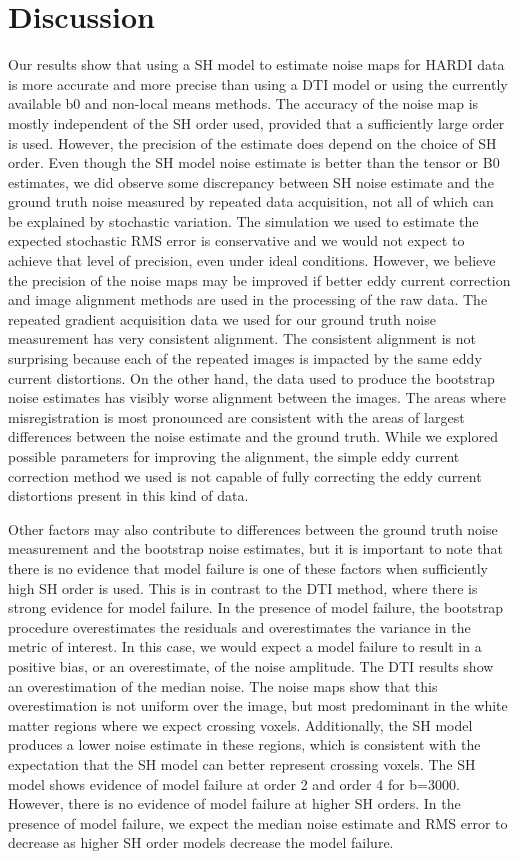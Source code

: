 \section{Discussion}

Our results show that using a SH model to estimate noise maps for HARDI
data is more accurate and more precise than using a DTI model or using
the currently available b0 and non-local means methods. The accuracy of
the noise map is mostly independent of the SH order used, provided that
a sufficiently large order is used. However, the precision of the
estimate does depend on the choice of SH order. Even though the SH model
noise estimate is better than the tensor or B0 estimates, we did observe
some discrepancy between SH noise estimate and the ground truth noise
measured by repeated data acquisition, not all of which can be explained
by stochastic variation. The simulation we used to estimate the expected
stochastic RMS error is conservative and we would not expect to achieve
that level of precision, even under ideal conditions. However, we
believe the precision of the noise maps may be improved if better eddy
current correction and image alignment methods are used in the
processing of the raw data. The repeated gradient acquisition data we
used for our ground truth noise measurement has very consistent
alignment. The consistent alignment is not surprising because each of
the repeated images is impacted by the same eddy current distortions. On
the other hand, the data used to produce the bootstrap noise estimates
has visibly worse alignment between the images. The areas where
misregistration is most pronounced are consistent with the areas of
largest differences between the noise estimate and the ground truth.
While we explored possible parameters for improving the alignment, the
simple eddy current correction method we used is not capable of fully
correcting the eddy current distortions present in this kind of data.

Other factors may also contribute to differences between the ground
truth noise measurement and the bootstrap noise estimates, but it is
important to note that there is no evidence that model failure is one of
these factors when sufficiently high SH order is used. This is in
contrast to the DTI method, where there is strong evidence for model
failure. In the presence of model failure, the bootstrap procedure
overestimates the residuals and overestimates the variance in the metric
of interest. In this case, we would expect a model failure to result in
a positive bias, or an overestimate, of the noise amplitude. The DTI
results show an overestimation of the median noise. The noise maps show
that this overestimation is not uniform over the image, but most
predominant in the white matter regions where we expect crossing voxels.
Additionally, the SH model produces a lower noise estimate in these
regions, which is consistent with the expectation that the SH model can
better represent crossing voxels. The SH model shows evidence of model
failure at order 2 and order 4 for b=3000. However, there is no evidence
of model failure at higher SH orders. In the presence of model failure,
we expect the median noise estimate and RMS error to decrease as higher
SH order models decrease the model failure.

